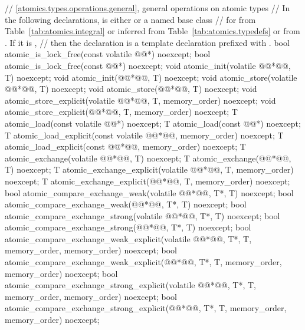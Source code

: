 \begin{codeblock}
{  // \ref{atomics.types.operations.general}, general operations on atomic types
  // In the following declarations,  is either  or a named base class
  // for  from Table~\ref{tab:atomics.integral} or inferred from Table~\ref{tab:atomics.typedefs} or from . If it is ,
  // then the declaration is a template declaration prefixed with .
  bool atomic_is_lock_free(const volatile @@*) noexcept;
  bool atomic_is_lock_free(const @@*) noexcept;
  void atomic_init(volatile @@*@\itcorr[-1]@, T) noexcept;
  void atomic_init(@@*@\itcorr[-1]@, T) noexcept;
  void atomic_store(volatile @@*@\itcorr[-1]@, T) noexcept;
  void atomic_store(@@*@\itcorr[-1]@, T) noexcept;
  void atomic_store_explicit(volatile @@*@\itcorr[-1]@, T, memory_order) noexcept;
  void atomic_store_explicit(@@*@\itcorr[-1]@, T, memory_order) noexcept;
  T atomic_load(const volatile @@*) noexcept;
  T atomic_load(const @@*) noexcept;
  T atomic_load_explicit(const volatile @@*@\itcorr[-1]@, memory_order) noexcept;
  T atomic_load_explicit(const @@*@\itcorr[-1]@, memory_order) noexcept;
  T atomic_exchange(volatile @@*@\itcorr[-1]@, T) noexcept;
  T atomic_exchange(@@*@\itcorr[-1]@, T) noexcept;
  T atomic_exchange_explicit(volatile @@*@\itcorr[-1]@, T, memory_order) noexcept;
  T atomic_exchange_explicit(@@*@\itcorr[-1]@, T, memory_order) noexcept;
  bool atomic_compare_exchange_weak(volatile @@*@\itcorr[-1]@, T*, T) noexcept;
  bool atomic_compare_exchange_weak(@@*@\itcorr[-1]@, T*, T) noexcept;
  bool atomic_compare_exchange_strong(volatile @@*@\itcorr[-1]@, T*, T) noexcept;
  bool atomic_compare_exchange_strong(@@*@\itcorr[-1]@, T*, T) noexcept;
  bool atomic_compare_exchange_weak_explicit(volatile @@*@\itcorr[-1]@, T*, T,
    memory_order, memory_order) noexcept;
  bool atomic_compare_exchange_weak_explicit(@@*@\itcorr[-1]@, T*, T,
    memory_order, memory_order) noexcept;
  bool atomic_compare_exchange_strong_explicit(volatile @@*@\itcorr[-1]@, T*, T,
    memory_order, memory_order) noexcept;
  bool atomic_compare_exchange_strong_explicit(@@*@\itcorr[-1]@, T*, T,
    memory_order, memory_order) noexcept;

}
\end{codeblock}
